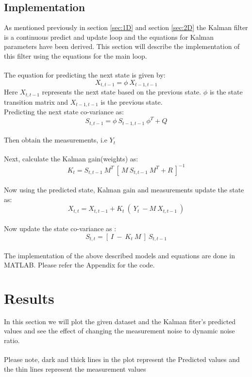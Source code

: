 \documentclass[12pt]{article}
\begin{document}
\subsection{Implementation}
\label{sec:implementation}
As mentioned previously in section \ref{sec:1D} and section \ref{sec:2D} the Kalman filter is a continuous predict and update loop and the equations for Kalman parameters have been derived. This section will describe the implementation of this filter using the equations for the main loop.\\
\\
The equation for predicting the next state is given by:
\begin{equation}
	X_{t,t-1} = \phi\  X_{t-1,t-1}
\label{eq:imp predict}
\end{equation}
Here $X_{t,t-1}$ represents the next state based on the previous state. $\phi$ is the state transition matrix and $X_{t-1,t-1}$ is the previous state.
\\
Predicting the next state co-variance as:
\begin{equation}
	S_{t,t-1} = \phi\  S_{t-1,t-1}\ \phi^T + Q
\label{eq:imp predict state co-var}
\end{equation}
\\
Then obtain the measurements, i.e $Y_t$ \\
\\
Next, calculate the Kalman gain(weights) as:
\begin{equation}
	K_t = S_{t,t-1}\ M^T\ [\ M\ S_{t,t-1}\ M^T + R\ ]^{-1}
\label{eq:imp kalman gain}
\end{equation}
\\
Now using the predicted state, Kalman gain and measurements update the state as:
\begin{equation}
	X_{t,t} = X_{t,t-1} + K_t\ (\ Y_t\ - M\ X_{t,t-1}\ )
\label{eq:imp state update}
\end{equation}
\\
Now update the state co-variance as :
\begin{equation}
	S_{t,t} = [\ I\ -\ K_t\ M\ ]\ S_{t,t-1}
\label{eq:imp state co-var update}
\end{equation}
\\
The implementation of the above described models and equations are done in MATLAB. Please refer the Appendix for the code.  


\section{Results}
In this section we will plot the given dataset and the Kalman fiter's predicted values and see the effect of changing the measurement noise to dynamic noise ratio.\\
\\
Please note, dark and thick lines in the plot represent the Predicted values and the thin lines represent the measurement values
\end{document}
